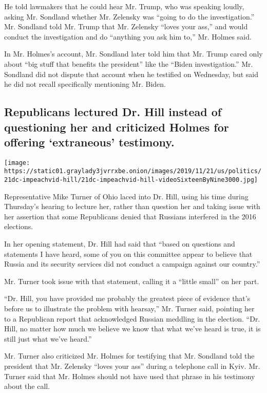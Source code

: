 He told lawmakers that he could hear Mr. Trump, who was speaking loudly,
asking Mr. Sondland whether Mr. Zelensky was ``going to do the
investigation.'' Mr. Sondland told Mr. Trump that Mr. Zelensky ``loves
your ass,'' and would conduct the investigation and do ``anything you
ask him to,'' Mr. Holmes said.

In Mr. Holmes's account, Mr. Sondland later told him that Mr. Trump
cared only about ``big stuff that benefits the president'' like the
``Biden investigation.'' Mr. Sondland did not dispute that account when
he testified on Wednesday, but said he did not recall specifically
mentioning Mr. Biden.

\hypertarget{republicans-lectured-dr-hill-instead-of-questioning-her-and-criticized-holmes-for-offering-extraneous-testimony}{%
\subsection{Republicans lectured Dr. Hill instead of questioning her and
criticized Holmes for offering `extraneous'
testimony.}\label{republicans-lectured-dr-hill-instead-of-questioning-her-and-criticized-holmes-for-offering-extraneous-testimony}}

\texttt{[image: https://static01.graylady3jvrrxbe.onion/images/2019/11/21/us/politics/21dc-impeachvid-hill/21dc-impeachvid-hill-videoSixteenByNine3000.jpg]}

Representative Mike Turner of Ohio laced into Dr. Hill, using his time
during Thursday's hearing to lecture her, rather than question her and
taking issue with her assertion that some Republicans denied that
Russians interfered in the 2016 elections.

In her opening statement, Dr. Hill had said that ``based on questions
and statements I have heard, some of you on this committee appear to
believe that Russia and its security services did not conduct a campaign
against our country.''

Mr. Turner took issue with that statement, calling it a ``little small''
on her part.

``Dr. Hill, you have provided me probably the greatest piece of evidence
that's before us to illustrate the problem with hearsay,'' Mr. Turner
said, pointing her to a Republican report that acknowledged Russian
meddling in the election. ``Dr. Hill, no matter how much we believe we
know that what we've heard is true, it is still just what we've heard.''

Mr. Turner also criticized Mr. Holmes for testifying that Mr. Sondland
told the president that Mr. Zelensky ``loves your ass'' during a
telephone call in Kyiv. Mr. Turner said that Mr. Holmes should not have
used that phrase in his testimony about the call.

